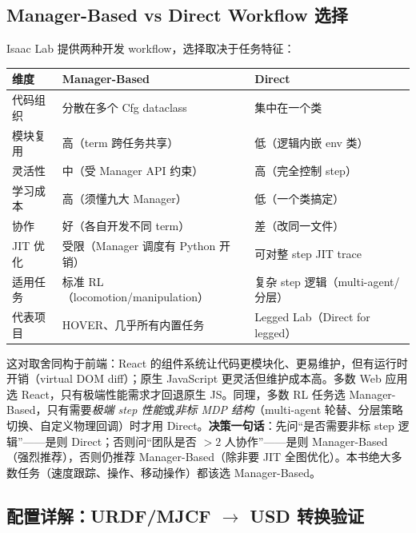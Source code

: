 \subsection{Manager-Based vs Direct Workflow 选择}
\label{sec:rlmc-diy-isaac-workflow}

Isaac Lab 提供两种开发 workflow，选择取决于任务特征：

\begin{center}
\small
\begin{tabular}{@{}lp{4.4cm}p{4.8cm}@{}}
\toprule
维度 & Manager-Based & Direct \\
\midrule
代码组织 & 分散在多个 Cfg dataclass & 集中在一个类 \\
模块复用 & 高（term 跨任务共享） & 低（逻辑内嵌 env 类） \\
灵活性 & 中（受 Manager API 约束） & 高（完全控制 step） \\
学习成本 & 高（须懂九大 Manager） & 低（一个类搞定） \\
协作 & 好（各自开发不同 term） & 差（改同一文件） \\
JIT 优化 & 受限（Manager 调度有 Python 开销） & 可对整 step JIT trace \\
适用任务 & 标准 RL（locomotion/manipulation） & 复杂 step 逻辑（multi-agent/分层） \\
代表项目 & HOVER、几乎所有内置任务 & Legged Lab（Direct for legged） \\
\bottomrule
\end{tabular}
\end{center}

\begin{insight}\label{ins:rlmc-diy-react}
这对取舍同构于前端：React 的组件系统让代码更模块化、更易维护，但有运行时开销（virtual DOM diff）；原生 JavaScript 更灵活但维护成本高。多数 Web 应用选 React，只有极端性能需求才回退原生 JS。同理，多数 RL 任务选 Manager-Based，只有需要\emph{极端 step 性能}或\emph{非标 MDP 结构}（multi-agent 轮替、分层策略切换、自定义物理回调）时才用 Direct。\textbf{决策一句话}：先问“是否需要非标 step 逻辑”——是则 Direct；否则问“团队是否 $>2$ 人协作”——是则 Manager-Based（强烈推荐），否则仍推荐 Manager-Based（除非要 JIT 全图优化）。本书绝大多数任务（速度跟踪、操作、移动操作）都该选 Manager-Based。
\end{insight}

\subsection{\texorpdfstring{配置详解：URDF/MJCF $\to$ USD 转换验证}{配置详解：URDF/MJCF 到 USD 转换验证}}
\label{sec:rlmc-diy-isaac-convert}

